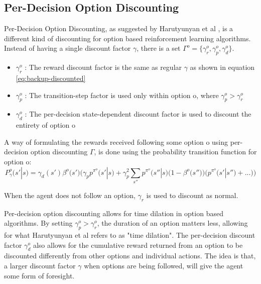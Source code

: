 \documentclass[12pt,a4paper]{article}
\begin{document}
\begin{multicols}{2}
\subsection{Per-Decision Option Discounting}
Per-Decision Option Discounting, as suggested by Harutyunyan et al \cite{pmlr-v97-harutyunyan19a}, is a different kind of discounting for option based reinforcement learning algorithms. Instead of having a single discount factor $\gamma$, there is a set $\Gamma^o = \big\{ \gamma^o_{r}, \gamma^o_{p}, \gamma^o_{d}  \big\}$.
\begin{itemize}
    \item $\gamma^o_{r}$ : The reward discount factor is the same as regular $\gamma$ as shown in equation \eqref{eq:backup-discounted}
    \item $\gamma^o_{p}$ : The transition-step factor is used only within option o, where $\gamma^o_{p} > \gamma^o_{r}$
    \item $\gamma^o_{d}$ : The per-decision state-dependent discount factor is used to discount the entirety of option o
\end{itemize}

A way of formulating the rewards received following some option o using per-decision option discounting $\Gamma$, is done using the probability transition function for option o:
\begin{dmath}
    P^o_{\gamma}\big(s'|s\big) = \gamma_{d}(s')\beta^o\big(s'\big) \bigg(\gamma_{p}p^\pi^o \big(s'|s\big) +  \gamma^2_{p}\sum_{s''}p^\pi^o \big(s''|s\big)(1 - \beta^o  \big(s''\big)\big)\big(p^\pi^o\big(s'|s''\big)+...\big)\bigg)
\end{dmath}

When the agent does not follow an option, $\gamma_{r}$ is used to discount as normal.

Per-decision option discounting allows for time dilation in option based algorithms. By setting $\gamma^o_{p} > \gamma^o_{r}$, the duration of an option matters less, allowing for what Harutyunyan et al refers to as "time dilation". The per-decision discount factor $\gamma^o_{d}$ also allows for the cumulative reward returned from an option to be discounted differently from other options and individual actions. The idea is that, a larger discount factor $\gamma$ when options are being followed, will give the agent some form of foresight.


\end{multicols}
\end{document}
